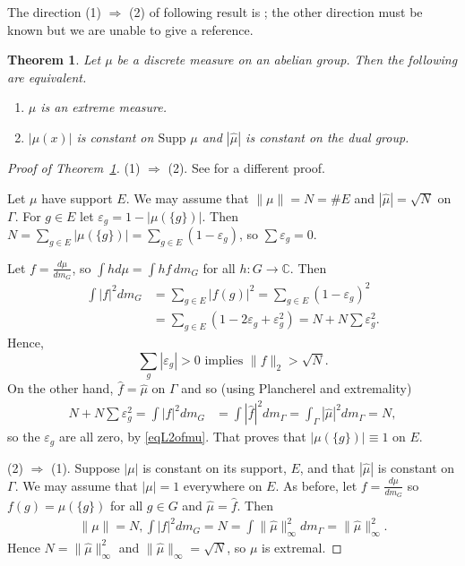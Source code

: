 \documentclass[letter,11pt]{amsart}
\newtheorem{theorem}{Theorem}%
\numberwithin{theorem}{section}
\theoremstyle{remark}
\numberwithin{equation}{section}
\newcommand{\lemref}[1]{Lemma~\ref{#1}}
\newcommand{\thmref}[1]{Theorem~\ref{#1}}
\newcommand\Supp{\text{Supp\	}}
\begin{document}
The direction (1) $\Rightarrow$ (2) of following result 
is \cite[Lemma 1.1]{MR627683}; the other
 direction must be known but we are unable to give a reference.
\begin{theorem}\label{thmExtrMsConstant} Let $\mu$ be a discrete measure on an abelian group. Then the following are equivalent.
\begin{enumerate}
  \item
$\mu$ is an extreme measure. 
\item 
 $|\mu(x)|$ is constant on $\Supp\mu$ and
$|\widehat\mu|$ is constant on the dual group.
\end{enumerate}
\end{theorem} 

\begin{proof}[Proof of \thmref{thmExtrMsConstant}]
(1) $\Rightarrow$ (2). See
\cite[Lemma 1.1]{MR627683} for a different proof.

Let $\mu$ have support $E$.  We may assume that
$\|\mu\|=N=\#E$ and $|\widehat\mu|=\sqrt{N}$ on $\Gamma$. For $g\in E$ let $\varepsilon_g=1-|\mu(\{g\})|$.
Then $N=\sum_{g\in E}|\mu(\{g\})| = \sum_{g\in E}(1-\varepsilon_g)$,
so $\sum\varepsilon_g=0$.

Let $f=\frac{d\mu}{dm_G}$, so 
$\int hd\mu = \int hf\,dm_G$ for all $h:G\to\mathbb C$. 
Then 
\begin{align*}
\int |f|^2dm_G &= \sum_{g\in E}|f(g)|^2 
%
=\sum_{g\in E}(1-\varepsilon_g)^2
%
\\
&=\sum_{g\in E}(1-2\varepsilon_g+\varepsilon_g^2)
={N} +N\sum\varepsilon_g^2.
\end{align*}
Hence, 
\begin{equation}\label{eqL2ofmu}
\sum_g|\varepsilon_g|>0 \text{ implies }
 \|f\|_2>\sqrt{{N}}.
 \end{equation}
  On the other hand, $\widehat f= \widehat\mu$ on $\Gamma$ and
so (using Plancherel and extremality)
\begin{align}
{N}+N\sum\varepsilon_g^2 =\int |f|^2dm_G &= 
\int|\widehat f|^2 dm_{\Gamma}=
\int_\Gamma|\widehat\mu|^2 dm_\Gamma
%
= N,
\end{align}
so the $\varepsilon_g$ are all zero, by \eqref{eqL2ofmu}. 
That proves that $|\mu(\{g\})|\equiv 1$
on $E$. 


(2) $\Rightarrow$ (1).
Suppose $|\mu|$ is constant on its support, $E$, 
and that $|\widehat\mu|$ is constant on $\Gamma$.
We may 
assume
that  $|\mu|=1$ everywhere on $E$. 
 As before, let $f=\frac{d\mu}{dm_G}$
 so $f(g)=\mu(\{g\})$ for all $g \in G$ and $\widehat\mu=\widehat f$. Then 
\begin{align}
\|\mu\|=N,  \int|f|^2dm_G= N = \int \|\widehat\mu\|_\infty^2 dm_\Gamma =
\|\widehat\mu\|_\infty^2.
\end{align}
Hence $N = \|\widehat\mu\|_\infty^2$ and $\|\widehat\mu\|_\infty =\sqrt N$, so $\mu$ is extremal.
\end{proof}
\end{document}
